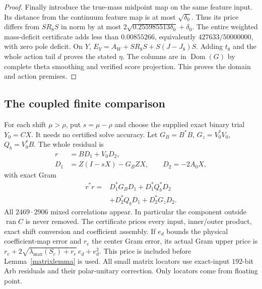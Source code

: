\documentclass[12pt]{article}
\theoremstyle{remark}\newtheorem{remark}[theorem]{Remark}
\newcommand{\Ran}{\operatorname{ran}}
\newcommand{\Dom}{\operatorname{Dom}}
\begin{document}
\begin{proof}
Finally introduce the true-mass midpoint map on the same feature input.
Its distance from the continuum feature map is at most $\sqrt{\delta_0}$.
Thus its price differs from $SR_8S$ in norm by at most
$2\sqrt{0.255985513\delta_0}+\delta_0$.
The entire weighted mass-deficit certificate adds less than
$0.00855266$, equivalently $427633/50000000$,
with zero pole deficit.
On $Y$, $E_Y=A_W+SR_8S+S(J-J_8)S$.
Adding $t_8$ and the whole action tail $d$ proves the stated $\eta$.
The columns are in $\Dom(G)$ by complete theta smoothing and
verified score projection. This proves the domain and action premises.
\end{proof}

\subsection{The coupled finite comparison}
For each shift $\mu>\rho$, put $s=\mu-\rho$ and choose the supplied
exact binary trial $Y_0=CX$. It needs no certified solve accuracy.
Let $G_B=B^*B$, $G_z=V_0^*V_0$, $Q_b=V_0^*B$. The whole residual is
\begin{align*}
 r&=BD_1+V_0D_2,\\
 D_1&=Z(I-sX)-G_BZX,\qquad D_2=-2A_0X,
\end{align*}
with exact Gram
\begin{align*}
 r^*r={}&D_1^*G_BD_1+D_1^*Q_b^*D_2\\
       &+D_2^*Q_bD_1+D_2^*G_zD_2.
\end{align*}
All $2469\cdot2906$ mixed correlations appear. In particular the
component outside $\Ran C$ is never removed. The certificate prices
every input, inner/outer product, exact shift conversion and coefficient
assembly. If $e_d$ bounds the physical coefficient-map error and
$r_e$ the center Gram error, its actual Gram upper price is
$r_e+2\sqrt{\lambda_{\max}(S_c)+r_e}\,e_d+e_d^2$.
This price is included before Lemma~\ref{matrixlemma} is used.
All small matrix locators use exact-input $192$-bit Arb residuals and
their polar-unitary correction. Only locators come from floating point.
\end{document}

